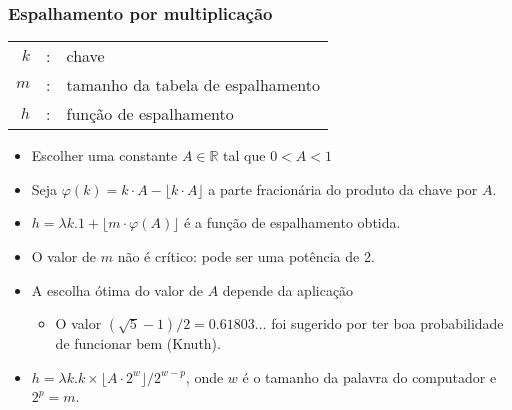 \documentclass{beamer}
\begin{document}
\begin{frame}

  \frametitle{Espalhamento por multiplicação}

  \begin{tabular}{rcl}
    $k$ & : & chave \\
    $m$ & : & tamanho da tabela de espalhamento \\
    $h$ & : & função de espalhamento \\
  \end{tabular}
  
  \begin{itemize}
    
  \item Escolher uma constante $A \in \mathbb{R}$ tal que $0 < A < 1$

  \item Seja $\varphi(k) = k \cdot A - \lfloor k \cdot A \rfloor $ a parte
    fracionária do produto da chave por $A$.

  \item $h = \lambda k . 1 + \lfloor m \cdot \varphi(A) \rfloor$ é a função de espalhamento obtida.

  \item O valor de $m$ não é crítico: pode ser uma potência de 2.

  \item A escolha ótima do valor de $A$ depende da aplicação

    \begin{itemize}

    \item O valor $(\sqrt{5} - 1)/2 = 0.61803...$ foi sugerido por ter boa probabilidade de funcionar bem (Knuth).

    \end{itemize}

  \item $h = \lambda k . k \times \lfloor A \cdot 2^w \rfloor / 2^{w-p}$, onde $w$
    é o tamanho da palavra do computador e $2^p = m$.

  \end{itemize}

\end{frame}

\end{document}
